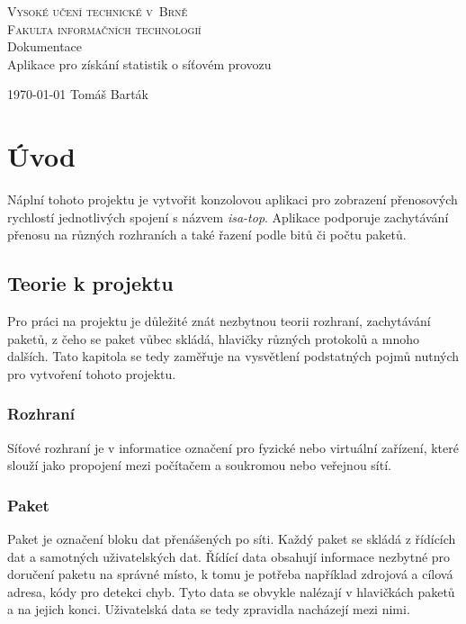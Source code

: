 \documentclass[a4paper, 11pt, hidelinks]{article}
\begin{document}
\begin{titlepage}
	\begin{center}
		\textsc{
			\Huge{Vysoké učení technické v~Brně}\\
			\huge{Fakulta informačních technologií\\}
		}
		\LARGE{
			Dokumentace\\
			\Huge{Aplikace pro získání statistik o síťovém provozu}\\
		}
	\end{center}
	{\Large{
		\today
		\hfill
		Tomáš Barták
		}
	}
\end{titlepage}
\newpage

\tableofcontents
\newpage

\section{Úvod}
Náplní tohoto projektu je vytvořit konzolovou aplikaci pro zobrazení přenosových rychlostí jednotlivých spojení s názvem \emph{isa-top}. Aplikace podporuje zachytávání přenosu na různých rozhraních a také řazení podle bitů či počtu paketů.

\subsection{Teorie k projektu}
Pro práci na projektu je důležité znát nezbytnou teorii rozhraní, zachytávání paketů, z čeho se paket vůbec skládá, hlavičky různých protokolů a mnoho dalších.
Tato kapitola se tedy zaměřuje na vysvětlení podstatných pojmů nutných pro vytvoření tohoto projektu.

\subsubsection{Rozhraní}
Síťové rozhraní je v informatice označení pro fyzické nebo virtuální zařízení, které slouží jako propojení mezi počítačem a soukromou nebo veřejnou sítí. \cite{interface}

\subsubsection{Paket}
Paket je označení bloku dat přenášených po síti. Každý paket se skládá z řídících dat a samotných uživatelských dat. Řídící data obsahují informace nezbytné pro doručení paketu na správné místo, k tomu je potřeba například zdrojová a cílová adresa, kódy pro detekci chyb. Tyto data se obvykle nalézají v hlavičkách paketů a na jejich konci. Uživatelská data se tedy zpravidla nacházejí mezi nimi. \cite{packet}
\end{document}
